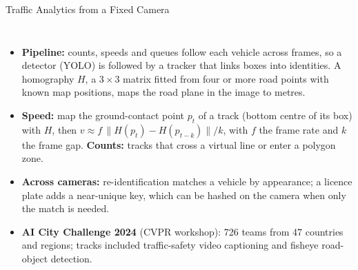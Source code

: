 \begin{frame}{Traffic Analytics from a Fixed Camera}
  \begin{columns}[T,onlytextwidth]
      \begin{itemize}\footnotesize\itemsep0.3em
        \item \textbf{Pipeline:} counts, speeds and queues follow each vehicle across frames, so a detector (YOLO) is followed by a tracker that links boxes into identities. A homography $H$, a $3\times3$ matrix fitted from four or more road points with known map positions, maps the road plane in the image to metres.
        \item \textbf{Speed:} map the ground-contact point $p_t$ of a track (bottom centre of its box) with $H$, then $v \approx f\,\lVert H(p_t) - H(p_{t-k})\rVert / k$, with $f$ the frame rate and $k$ the frame gap. \textbf{Counts:} tracks that cross a virtual line or enter a polygon zone.
        \item \textbf{Across cameras:} re-identification matches a vehicle by appearance; a licence plate adds a near-unique key, which can be hashed on the camera when only the match is needed.
        \item \textbf{AI City Challenge 2024} (CVPR workshop): 726 teams from 47 countries and regions; tracks included traffic-safety video captioning and fisheye road-object detection.
      \end{itemize}
      \centering
      \vspace{0.2em}
\end{columns}
\end{frame}
